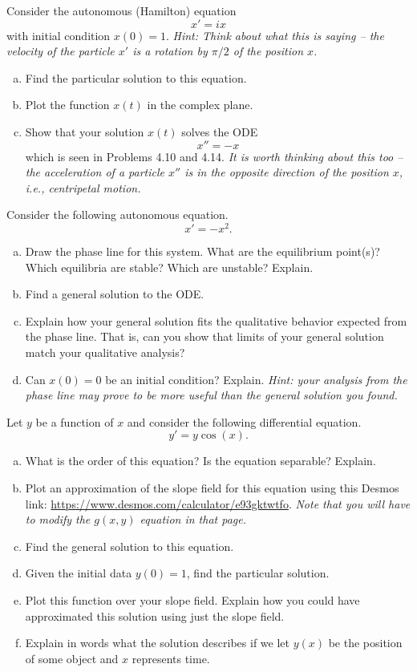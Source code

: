 \begin{problem}
Consider the autonomous (Hamilton) equation
\[
	x'=ix
\]
with initial condition $x(0)=1$. \emph{Hint: Think about what this is saying -- the velocity of the particle $x'$ is a rotation by $\pi/2$ of the position $x$.}
\begin{enumerate}[(a)]
	\item Find the particular solution to this equation.
	\item Plot the function $x(t)$ in the complex plane.
	\item Show that your solution $x(t)$ solves the ODE
	\[
		x'' = - x
	\]
	which is seen in Problems 4.10 and 4.14. \emph{It is worth thinking about this too -- the acceleration of a particle $x''$ is in the opposite direction of the position $x$, i.e., centripetal motion.}
\end{enumerate}
\end{problem}

\begin{problem}
Consider the following autonomous equation.
    \[
    x'=-x^2.
    \]
    \begin{enumerate}[(a)]
        \item Draw the phase line for this system. What are the equilibrium point(s)? Which equilibria are stable? Which are unstable? Explain.
        \item Find a general solution to the ODE.
        \item Explain how your general solution fits the qualitative behavior expected from the phase line. That is, can you show that limits of your general solution match your qualitative analysis?
        \item Can $x(0)=0$ be an initial condition? Explain. \emph{Hint: your analysis from the phase line may prove to be more useful than the general solution you found.}
    \end{enumerate}
\end{problem}


\begin{problem}
Let $y$ be a function of $x$ and consider the following differential equation.
\[
y' = y\cos(x).
\]
\begin{enumerate}[(a)]
    \item What is the order of this equation? Is the equation separable? Explain.
    \item Plot an approximation of the slope field for this equation using this Desmos link: \url{https://www.desmos.com/calculator/e93gktwtfo}. \emph{Note that you will have to modify the $g(x,y)$ equation in that page.}
    \item Find the general solution to this equation.
    \item Given the initial data $y(0)=1$, find the particular solution.
    \item Plot this function over your slope field. Explain how you could have approximated this solution using just the slope field.
    \item Explain in words what the solution describes if we let $y(x)$ be the position of some object and $x$ represents time.
\end{enumerate}
\end{problem}

